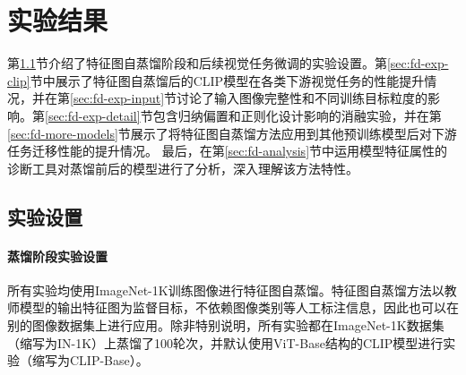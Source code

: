 \section{实验结果}
\label{sec:fd-result}

第\ref{sec:fd-exp-setting}节介绍了特征图自蒸馏阶段和后续视觉任务微调的实验设置。第\ref{sec:fd-exp-clip}节中展示了特征图自蒸馏后的CLIP模型在各类下游视觉任务的性能提升情况，并在第\ref{sec:fd-exp-input}节讨论了输入图像完整性和不同训练目标粒度的影响。第\ref{sec:fd-exp-detail}节包含归纳偏置和正则化设计影响的消融实验，并在第\ref{sec:fd-more-models}节展示了将特征图自蒸馏方法应用到其他预训练模型后对下游任务迁移性能的提升情况。
最后，在第\ref{sec:fd-analysis}节中运用模型特征属性的诊断工具对蒸馏前后的模型进行了分析，深入理解该方法特性。

\subsection{实验设置}
\label{sec:fd-exp-setting}
\paragraph{蒸馏阶段实验设置} 所有实验均使用ImageNet-1K\cite{deng2009imagenet}训练图像进行特征图自蒸馏。特征图自蒸馏方法以教师模型的输出特征图为监督目标，不依赖图像类别等人工标注信息，因此也可以在别的图像数据集上进行应用。除非特别说明，所有实验都在ImageNet-1K数据集（缩写为IN-1K）上蒸馏了100轮次，并默认使用ViT-Base\cite{dosovitskiy2020vit}结构的CLIP模型进行实验（缩写为CLIP-Base）。%
